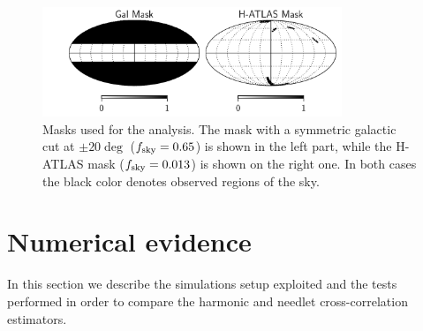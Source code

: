 \documentclass[a4paper,11pt]{article}
\begin{document}
\begin{figure}[tbp]
\centering %
\includegraphics[width=0.8\textwidth]{images/masks.pdf}
\caption{\label{fig:masks} Masks used for the analysis. The mask with a symmetric galactic cut at $\pm 20\deg$ ($f_{\rm sky}= 0.65$) is shown
in the left part, while the H-ATLAS mask ($f_{\rm sky} = 0.013$) is shown on the right one. In both cases the black color denotes
observed regions of the sky.}
\end{figure}
%

\section{Numerical evidence}
\label{sec:num_ev}
In this section we describe the simulations setup exploited and the tests performed in order to compare the harmonic and needlet cross-correlation estimators.
\end{document}
